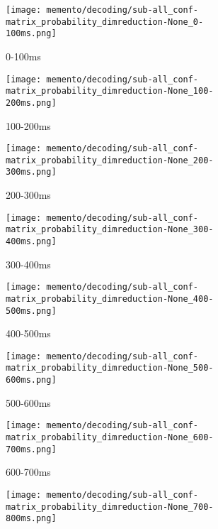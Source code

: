 \begin{figure}[H]
	\centering
	\begin{subfigure}{.18\textwidth}
		\texttt{[image: memento/decoding/sub-all\_conf-matrix\_probability\_dimreduction-None\_0-100ms.png]}
		\caption{0-100ms}
		\label{fig:conf0}
	\end{subfigure}
	\begin{subfigure}{0.18\textwidth}
		\texttt{[image: memento/decoding/sub-all\_conf-matrix\_probability\_dimreduction-None\_100-200ms.png]}
		\caption{100-200ms}
		\label{fig:conf1}
	\end{subfigure}
	\begin{subfigure}{.18\textwidth}
		\texttt{[image: memento/decoding/sub-all\_conf-matrix\_probability\_dimreduction-None\_200-300ms.png]}
		\caption{200-300ms}
		\label{fig:conf2}
	\end{subfigure}
	\begin{subfigure}{0.18\textwidth}
		\texttt{[image: memento/decoding/sub-all\_conf-matrix\_probability\_dimreduction-None\_300-400ms.png]}
		\caption{300-400ms}
		\label{fig:conf3}
	\end{subfigure}
	\begin{subfigure}{0.18\textwidth}
		\texttt{[image: memento/decoding/sub-all\_conf-matrix\_probability\_dimreduction-None\_400-500ms.png]}
		\caption{400-500ms}
		\label{fig:conf4}
	\end{subfigure}
	\begin{subfigure}{.18\textwidth}
		\texttt{[image: memento/decoding/sub-all\_conf-matrix\_probability\_dimreduction-None\_500-600ms.png]}
		\caption{500-600ms}
		\label{fig:conf5}
	\end{subfigure}
	\begin{subfigure}{0.18\textwidth}
		\texttt{[image: memento/decoding/sub-all\_conf-matrix\_probability\_dimreduction-None\_600-700ms.png]}
		\caption{600-700ms}
		\label{fig:conf6}
	\end{subfigure}
	\begin{subfigure}{.18\textwidth}
		\texttt{[image: memento/decoding/sub-all\_conf-matrix\_probability\_dimreduction-None\_700-800ms.png]}

\end{subfigure}
\end{figure}
